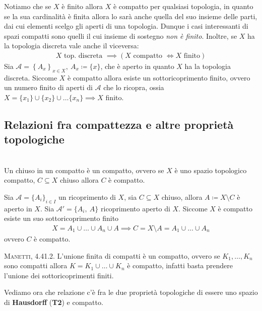 \begin{observe}
Notiamo che se $X$ è finito allora $X$ è compatto per qualsiasi topologia, in quanto se la sua cardinalità è finita allora lo sarà anche quella del suo insieme delle parti, dai cui elementi scelgo gli aperti di una topologia. Dunque i casi interessanti di spazi compatti sono quelli il cui insieme di sostegno \textit{non è finito}.\newline
Inoltre, se $X$ ha la topologia discreta vale anche il viceversa:
	\begin{gather*}
		X \text{ top. discreta } \implies \left( X \text{ compatto } \iff X \text{ finito}\right)
	\end{gather*}
Sia $\mathcal{A}=\left\{ A_x\right\}_{x\in X}, \ A_x\coloneqq \{x\}$, che è aperto in quanto $X$ ha la topologia discreta. Siccome $X$ è compatto allora esiste un sottoricoprimento finito, ovvero un numero finito di aperti di $\mathcal{A}$ che lo ricopra, ossia $X=\{x_1\}\cup\{x_2\}\cup\dots\{x_n\}\implies X$ finito.
\end{observe}
\subsection{Relazioni fra compattezza e altre proprietà topologiche}
\begin{theorema}~{}\label{chiuso in compatto}\\
Un chiuso in un compatto è un compatto, ovvero se $X$ è uno spazio topologico compatto, $C\subseteq X$ chiuso allora $C$ è compatto.
\end{theorema}
\begin{demonstration}
	Sia $\mathcal{A}=\{A_i \}_{i\in I}$ un ricoprimento di $X$, sia $C\subseteq X$ chiuso, allora $A\coloneqq X\setminus C$ è aperto in $X$.\newline
	Sia $\mathcal{A}'=\{A_i,\ A\}$ ricoprimento aperto di $X$. Siccome $X$ è compatto esiste un suo sottoricoprimento finito
		\begin{gather*}
			X=A_1\cup\dots\cup A_n\cup A \implies C=X\setminus A=A_1\cup\dots\cup A_n
		\end{gather*}
	ovvero $C$ è compatto.
\end{demonstration}

\begin{observe}\textsc{Manetti, 4.41.2.}
	L'unione finita di compatti è un compatto, ovvero se $K_1,\dots,K_n$ sono compatti allora $K=K_1\cup\dots\cup K_n$ è compatto, infatti basta prendere l'unione dei sottoricoprimenti finiti.
\end{observe}
Vediamo ora che relazione c'è fra le due proprietà topologiche di essere uno spazio di \textbf{Hausdorff} (\textbf{T2}) e compatto.

